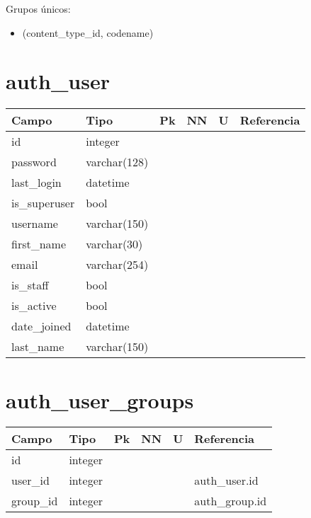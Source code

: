 Grupos únicos:

\begin{itemize}
	\item (content\_type\_id, codename)
\end{itemize}

\section{auth\_user}

\begin{tabular}{|l|l|l|l|l|l|}
	\hline
	\textbf{Campo} & \textbf{Tipo} & \textbf{Pk} & \textbf{NN} & \textbf{U} & \textbf{Referencia} \\
	\hline
	id & integer & \req & \req & \req & \\
	password & varchar(128) & \nreq & \req & \nreq & \\
	last\_login & datetime & \nreq & \nreq & \nreq & \\
	is\_superuser & bool  & \nreq & \req & \nreq & \\
	username & varchar(150) & \nreq & \req & \req & \\
	first\_name & varchar(30) & \nreq & \req & \nreq & \\
	email & varchar(254) & \nreq & \req & \nreq & \\
	is\_staff & bool & \nreq & \req & \nreq & \\
	is\_active & bool & \nreq & \req & \nreq & \\
	date\_joined & datetime & \nreq & \req & \nreq & \\
	last\_name & varchar(150) & \nreq & \req & \nreq & \\
	\hline
\end{tabular}

\section{auth\_user\_groups}

\begin{tabular}{|l|l|l|l|l|l|}
	\hline
	\textbf{Campo} & \textbf{Tipo} & \textbf{Pk} & \textbf{NN} & \textbf{U} & \textbf{Referencia} \\
	\hline
	id & integer & \req & \req & \req & \\
	user\_id & integer & \nreq & \req & \nreq & auth\_user.id \\
	group\_id & integer & \nreq & \req & \nreq & auth\_group.id \\
	\hline
\end{tabular} \\ 

